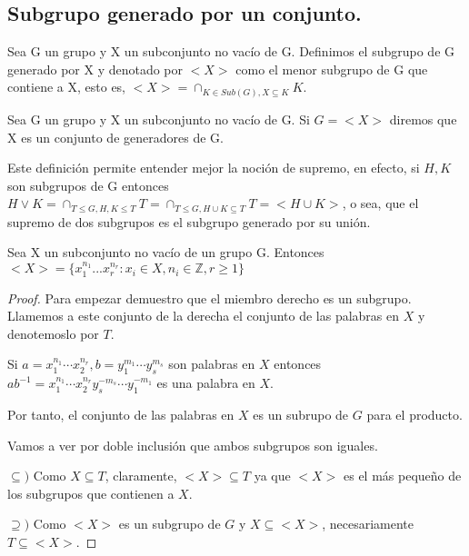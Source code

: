 \subsection{Subgrupo generado por un conjunto.}

\begin{definition}
Sea G un grupo y X un subconjunto no vacío de G. Definimos el subgrupo de G generado por X y denotado por $<X>$ como el menor subgrupo de G que contiene a X, esto es, 
$<X> = \cap_{K \in Sub(G),X \subseteq K} K$.
\end{definition}

\begin{definition}
Sea G un grupo y X un subconjunto no vacío de G. Si $G = <X>$ diremos que X es un conjunto de generadores de G.
\end{definition}

Este definición permite entender mejor la noción de supremo, en efecto, si $H,K$ son subgrupos de G entonces $H \lor K = \cap_{T \le G, H,K \le T} T = \cap_{T \le G, H \cup K \subseteq T} T = <H \cup K>$, o sea, que el supremo de dos subgrupos es el subgrupo generado por su unión.

\begin{proposition}
Sea X un subconjunto no vacío de un grupo G. Entonces $<X> = \{x_1^{n_1}...x_r^{n_r}:x_i \in X,n_i \in \mathbb{Z},r \ge 1\}$
\end{proposition}
\begin{proof}
Para empezar demuestro que el miembro derecho es un subgrupo. Llamemos a este conjunto de la derecha el conjunto de las palabras en $X$ y denotemoslo por $T$. 

Si $a = x_1^{n_1} \cdots x_2^{n_r}, b = y_1^{m_1} \cdots y_s^{m_s}$ son palabras en $X$ entonces $ab^{-1} =  x_1^{n_1} \cdots x_2^{n_r}y_s^{-m_s} \cdots y_1^{-m_1}$ es una palabra en $X$. 

Por tanto, el conjunto de las palabras en $X$ es un subrupo de $G$ para el producto. 

Vamos a ver por doble inclusión que ambos subgrupos son iguales. 

$\subseteq)$ Como $X \subseteq T$, claramente, $<X> \subseteq T$ ya que $<X>$ es el más pequeño de los subgrupos que contienen a $X$. 

$\supseteq)$ Como $<X>$ es un subgrupo de $G$ y $X \subseteq <X>$, necesariamente $T \subseteq <X>$. 
\end{proof}

